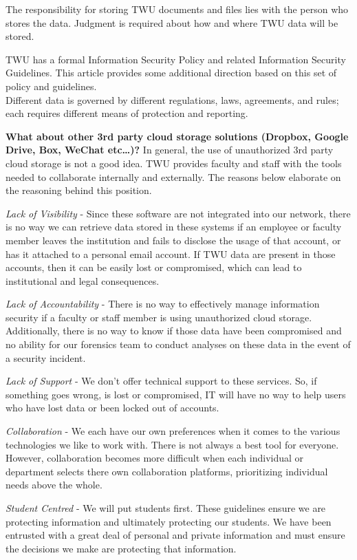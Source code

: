 \documentclass[
]{book}
\theoremstyle{definition}
\theoremstyle{definition}
\theoremstyle{definition}
\theoremstyle{definition}
\theoremstyle{remark}
\begin{document}
The responsibility for storing TWU documents and files lies with the person who stores the data. Judgment is required about how and where TWU data will be stored.

TWU has a formal Information Security Policy and related Information Security Guidelines. This article provides some additional direction based on this set of policy and guidelines.\\
Different data is governed by different regulations, laws, agreements, and rules; each requires different means of protection and reporting.

\textbf{What about other 3rd party cloud storage solutions (Dropbox, Google Drive, Box, WeChat etc\ldots)?}
In general, the use of unauthorized 3rd party cloud storage is not a good idea. TWU provides faculty and staff with the tools needed to collaborate internally and externally. The reasons below elaborate on the reasoning behind this position.

\emph{Lack of Visibility} - Since these software are not integrated into our network, there is no way we can retrieve data stored in these systems if an employee or faculty member leaves the institution and fails to disclose the usage of that account, or has it attached to a personal email account. If TWU data are present in those accounts, then it can be easily lost or compromised, which can lead to institutional and legal consequences.

\emph{Lack of Accountability} - There is no way to effectively manage information security if a faculty or staff member is using unauthorized cloud storage. Additionally, there is no way to know if those data have been compromised and no ability for our forensics team to conduct analyses on these data in the event of a security incident.

\emph{Lack of Support} - We don't offer technical support to these services. So, if something goes wrong, is lost or compromised, IT will have no way to help users who have lost data or been locked out of accounts.

\emph{Collaboration} - We each have our own preferences when it comes to the various technologies we like to work with. There is not always a best tool for everyone. However, collaboration becomes more difficult when each individual or department selects there own collaboration platforms, prioritizing individual needs above the whole.

\emph{Student Centred} - We will put students first. These guidelines ensure we are protecting information and ultimately protecting our students. We have been entrusted with a great deal of personal and private information and must ensure the decisions we make are protecting that information.
\end{document}
